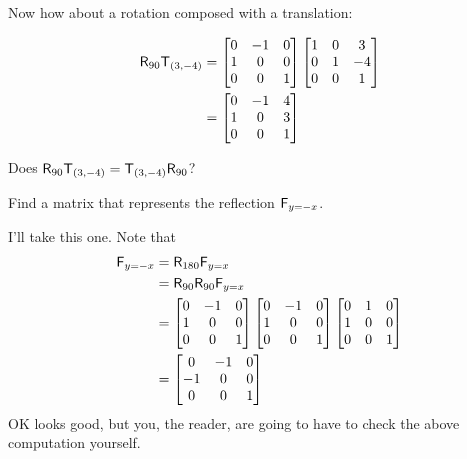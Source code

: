 Now how about a rotation composed with a translation:

\begin{align*}
\mathsf{R}_{90}\mathsf{T}_{(3,-4)} &= \begin{bmatrix}
0 & -1 & 0\\
1 & 0 & 0\\
0 & 0 & 1
\end{bmatrix}
\begin{bmatrix}
1 & 0 & 3\\
0 & 1 & -4\\
0 & 0 & 1
\end{bmatrix}\\
&=
\begin{bmatrix}
0 & -1 & 4\\
1 & 0 & 3\\
0 & 0 & 1
\end{bmatrix}
\end{align*}

\begin{ques}
Does $\mathsf{R}_{90}\mathsf{T}_{(3,-4)}= \mathsf{T}_{(3,-4)}\mathsf{R}_{90}$?
\end{ques}
\QM

\begin{ques} Find a matrix that represents the reflection $\mathsf{F}_{y=-x}$.
\end{ques}

I'll take this one. Note that 
\begin{align*}
\mathsf{F}_{y=-x} &= \mathsf{R}_{180} \mathsf{F}_{y=x} \\
&= \mathsf{R}_{90}\mathsf{R}_{90} \mathsf{F}_{y=x}\\
&= \begin{bmatrix}
0 & -1 & 0\\
1 & 0 & 0\\
0 & 0 & 1
\end{bmatrix}
\begin{bmatrix}
0 & -1 & 0\\
1 & 0 & 0\\
0 & 0 & 1
\end{bmatrix}
\begin{bmatrix}
0&  1 & 0\\
1 & 0 & 0\\
0 &  0 & 1
\end{bmatrix} \\
&=\begin{bmatrix}
0 &  -1 & 0\\
-1 & 0 & 0\\
0 &  0 & 1
\end{bmatrix} 
\end{align*}
OK looks good, but you, the reader, are going to have to check the
above computation yourself.



